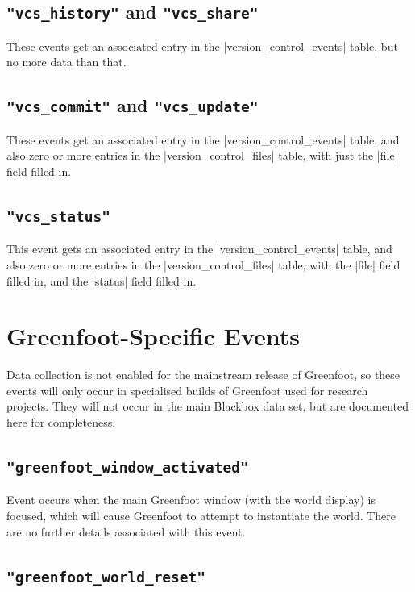 \documentclass{report}
\begin{document}
\subsection{\lstinline!"vcs_history"! and \lstinline!"vcs_share"!}

These events get an associated entry in the |version_control_events|
table, but no more data than that.

\subsection{\lstinline!"vcs_commit"! and \lstinline!"vcs_update"!}

These events get an associated entry in the |version_control_events|
table, and also zero or more entries in the |version_control_files|
table, with just the |file| field filled in.

\subsection{\lstinline!"vcs_status"!}

This event gets an associated entry in the |version_control_events|
table, and also zero or more entries in the |version_control_files|
table, with the |file| field filled in, and the |status| field filled
in.

\section{Greenfoot-Specific Events}

Data collection is not enabled for the mainstream release of Greenfoot,
so these events will only occur in specialised builds of Greenfoot
used for research projects.  They will not occur in the main Blackbox
data set, but are documented here for completeness.

\subsection{\lstinline!"greenfoot_window_activated"!}

Event occurs when the main Greenfoot window (with the world display) is
focused, which will cause Greenfoot to attempt to instantiate the world.
There are no further details associated with this event.

\subsection{\lstinline!"greenfoot_world_reset"!}
\end{document}
